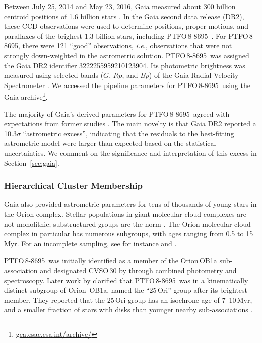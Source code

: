 \documentclass[12pt,twocolumn,tighten]{aastex62}
\newcommand{\ptfo}{PTFO$\,$8-8695}
\begin{document}
Between July 25, 2014 and May 23, 2016, Gaia measured about 300
billion centroid positions of 1{.}6 billion stars
\citep{gaia_collaboration_gaia_2016,lindegren_gaiasoln_2018,gaia_collaboration_gaia_2018}.
In the Gaia second data release (DR2), these CCD observations were
used to determine positions, proper motions, and parallaxes of the
brighest 1{.}3 billion stars, including \ptfo\
\citep{lindegren_gaiasoln_2018}.  For \ptfo, there were 121 ``good''
observations, {\it i.e.}, observations that were not strongly
down-weighted in the astrometric solution.  \ptfo\ was assigned the
Gaia DR2 identifier 3222255959210123904.  Its photometric brightness
was measured using selected bands ($G$, $Rp$, and $Bp$) of the Gaia
Radial Velocity Spectrometer
\citep{cropper_gaia_2018,evans_gaia_2018}.  We accessed the pipeline
parameters for \ptfo\ using the Gaia
archive\footnote{\url{gea.esac.esa.int/archive/}}.

The majority of Gaia's derived parameters for \ptfo\ agreed with
expectations from former studies
\citep{briceno_cida_2005,van_eyken_ptf_2012}.  The main novelty is
that Gaia DR2 reported a 10.3$\sigma$ ``astrometric excess'',
indicating that the residuals to the best-fitting astrometric model
were larger than expected based on the statistical uncertainties.  We
comment on the significance and interpretation of this excess in
Section~\ref{sec:gaia}.


\subsubsection{Hierarchical Cluster Membership}
\label{subsec:hierarchical}

Gaia also provided astrometric parameters for tens of thousands of
young stars in the Orion complex.  Stellar populations in giant
molecular cloud complexes are not monolithic; substructured groups are
the norm \citep{briceno_lowmassOB_2007}.  The Orion molecular cloud
complex in particular has numerous subgroups, with ages ranging from
0.5 to 15$\,$Myr. For an incomplete sampling, see for instance
\citet{briceno_cida_2005,jeffries_kinematic_2006,briceno_25_2007,kounkel_apogee2_2018}
and \citet{briceno_cidaII_2019}.

\ptfo\ was initially identified as a member of the Orion$\,$OB1a
sub-association and designated CVSO\,30 by \citet{briceno_cida_2005}
through combined photometry and spectroscopy.  Later work by
\citet{briceno_25_2007} clarified that \ptfo\ was in a kinematically
distinct subgroup of Orion~OB1a, named the ``25$\,$Ori'' group after
its brightest member. They reported that the 25$\,$Ori group has an
isochrone age of 7--10$\,$Myr, and a smaller fraction of stars with
disks than younger nearby sub-associations
\citep{hernandez_spitzer_ob1_2007}.
\end{document}
